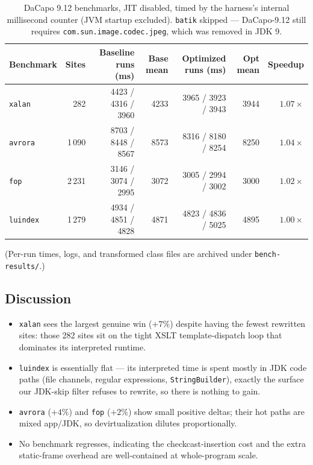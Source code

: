 \documentclass[11pt,a4paper]{article}
\begin{document}
\begin{table}[ht]
\centering
\small
\setlength{\tabcolsep}{5pt}
\begin{tabular}{@{}lrrrrrr@{}}
\toprule
Benchmark   & Sites & Baseline runs (ms) & Base mean & Optimized runs (ms) & Opt mean & Speedup \\
\midrule
\texttt{xalan}   & 282    & 4423 / 4316 / 3960 & 4233 & 3965 / 3923 / 3943 & 3944 & $\mathbf{1.07\times}$ \\
\texttt{avrora}  & 1\,090 & 8703 / 8448 / 8567 & 8573 & 8316 / 8180 / 8254 & 8250 & $1.04\times$ \\
\texttt{fop}     & 2\,231 & 3146 / 3074 / 2995 & 3072 & 3005 / 2994 / 3002 & 3000 & $1.02\times$ \\
\texttt{luindex} & 1\,279 & 4934 / 4851 / 4828 & 4871 & 4823 / 4836 / 5025 & 4895 & $1.00\times$ \\
\bottomrule
\end{tabular}
\caption{DaCapo 9.12 benchmarks, JIT disabled, timed by the harness's
internal millisecond counter (JVM startup excluded). \texttt{batik}
skipped --- DaCapo-9.12 still requires \texttt{com.sun.image.codec.jpeg},
which was removed in JDK 9.}
\end{table}

(Per-run times, logs, and transformed class files are archived under
\texttt{bench-results/}.)

\subsection*{Discussion}

\begin{itemize}[topsep=2pt,itemsep=0pt]
  \item \texttt{xalan} sees the largest genuine win ($+7\%$) despite
    having the fewest rewritten sites: those 282 sites sit on the tight
    XSLT template-dispatch loop that dominates its interpreted runtime.
  \item \texttt{luindex} is essentially flat --- its interpreted time is
    spent mostly in JDK code paths (file channels, regular expressions,
    \texttt{StringBuilder}), exactly the surface our JDK-skip filter
    refuses to rewrite, so there is nothing to gain.
  \item \texttt{avrora} ($+4\%$) and \texttt{fop} ($+2\%$) show small
    positive deltas; their hot paths are mixed app/JDK, so
    devirtualization dilutes proportionally.
  \item No benchmark regresses, indicating the checkcast-insertion cost
    and the extra static-frame overhead are well-contained at whole-program
    scale.
\end{itemize}
\end{document}
